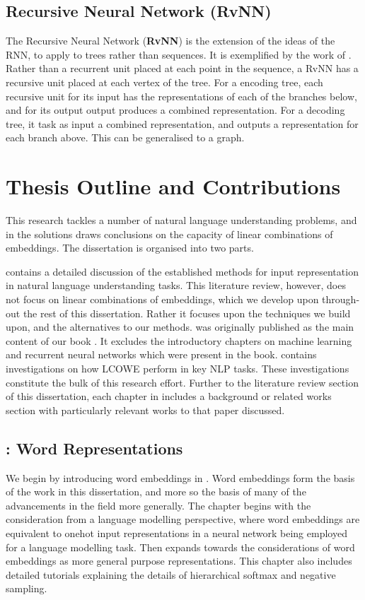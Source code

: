 \documentclass{book}
\begin{document}
\subsection {Recursive Neural Network (RvNN)}
The Recursive Neural Network (\textbf{RvNN}) is the extension of the ideas of the RNN,
to apply to trees rather than sequences.
It is exemplified by the work of \citet{socher2014recursive}.
Rather than a recurrent unit placed at each point in the sequence,
a RvNN has a recursive unit placed at each vertex of the tree.
For a encoding tree, each recursive unit for its input has the representations of each of the branches below,
and for its output output produces a combined representation.
For a decoding tree, it task as input a combined representation, and outputs a representation for each branch above.
This can be generalised to a graph.


\section{Thesis Outline and Contributions}
This research tackles a number of natural language understanding problems, and in the solutions draws conclusions on the capacity of linear combinations of embeddings.
The dissertation is organised into two parts.

 contains a detailed discussion of the established methods for input representation in natural language understanding tasks.
This literature review, however, does not focus on linear combinations of embeddings, which we develop upon through-out the rest of this dissertation.
Rather it focuses upon the techniques we build upon, and the alternatives to our methods.
 was originally published as the main content of our book  \citep{NRoNL}.
It excludes the introductory chapters on machine learning and recurrent neural networks which were present in the book.
 contains investigations on how LCOWE perform in key NLP tasks.
These investigations constitute the bulk of this research effort.
Further to the literature review section of this dissertation, each chapter in  includes a background or related works section with particularly relevant works to that paper discussed.



\subsection*{:  Word Representations}
We begin by introducing word embeddings in .
Word embeddings form the basis of the work in this dissertation, and more so the basis of many of the advancements in the field more generally.
The chapter begins with the consideration from a language modelling perspective,
where word embeddings are equivalent to onehot input representations in a neural network being employed for a language modelling task.
Then expands towards the considerations of word embeddings as more general purpose representations.
This chapter also includes detailed tutorials explaining the details of hierarchical softmax and negative sampling.
\end{document}
